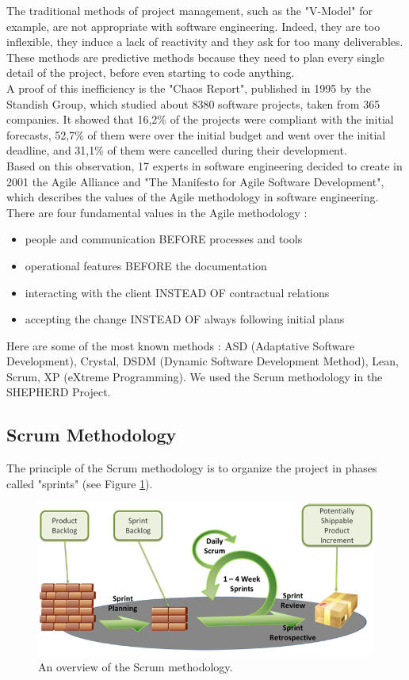 \documentclass[a4paper]{report}
\begin{document}
The traditional methods of project management, such as the "V-Model" for example, are not appropriate with software engineering. Indeed, they are too inflexible, they induce a lack of reactivity and they ask for too many deliverables. These methods are predictive methods because they need to plan every single detail of the project, before even starting to code anything.\\

A proof of this inefficiency is the "Chaos Report", published in 1995 by the Standish Group, which studied about 8380 software projects, taken from 365 companies. It showed that 16,2\% of the projects were compliant with the initial forecasts, 52,7\% of them were over the initial budget and went over the initial deadline, and 31,1\% of them were cancelled during their development.\\

Based on this observation, 17 experts in software engineering decided to create in 2001 the Agile Alliance and "The Manifesto for Agile Software Development", which describes the values of the Agile methodology in software engineering. There are four fundamental values in the Agile methodology :
\begin{itemize}
  \item people and communication BEFORE processes and tools
  \item operational features BEFORE the documentation
  \item interacting with the client INSTEAD OF contractual relations
  \item accepting the change INSTEAD OF always following initial plans\\
\end{itemize}

Here are some of the most known methods : ASD (Adaptative Software Development), Crystal, DSDM (Dynamic Software Development Method), Lean, Scrum, XP (eXtreme Programming). We used the Scrum methodology in the SHEPHERD Project.\\

\subsection{Scrum Methodology}

The principle of the Scrum methodology is to organize the project in phases called "sprints" (see Figure \ref{fig:scrum_overview}).\\ 

\begin{figure}[H]
	\centering
	\includegraphics[width=0.7\linewidth]{image/SCRUM-overview-resize.png}
	\caption{An overview of the Scrum methodology.}
	\label{fig:scrum_overview}
\end{figure}
\end{document}
